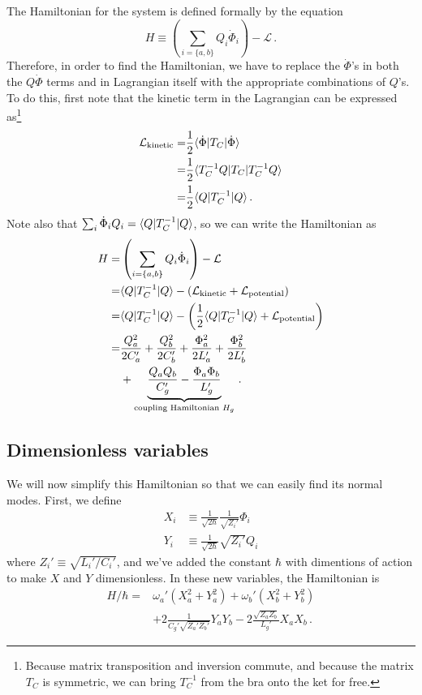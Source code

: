 \documentclass{article}
\begin{document}
The Hamiltonian for the system is defined formally by the equation
\begin{equation*}
  H \equiv \left( \sum_{i = \{a, b\}} Q_i \dot \Phi_i \right) - \mathcal{L} \, .
\end{equation*}
Therefore, in order to find the Hamiltonian, we have to replace the $\dot \Phi$'s in both the $Q \dot \Phi$ terms and in Lagrangian itself with the appropriate combinations of $Q$'s.
To do this, first note that the kinetic term in the Lagrangian can be expressed as\footnote{Because matrix transposition and inversion commute, and because the matrix $T_C$ is symmetric, we can bring $T_C^{-1}$ from the bra onto the ket for free.}
\begin{align*}
  \mathcal{L}_\text{kinetic}
  =& \frac{1}{2} \langle \dot \Phi | T_C | \dot \Phi \rangle \\
  =& \frac{1}{2} \langle T_C^{-1} Q | T_C | T_C^{-1} Q \rangle \\
  =& \frac{1}{2} \langle Q | T_C^{-1} | Q \rangle
  \, .
\end{align*}
Note also that $\sum_i \dot \Phi_i Q_i = \langle Q | T_C^{-1} | Q \rangle$, so we can write the Hamiltonian as
\begin{align}
  H
  =& \left( \sum_{i = \{a, b\}} Q_i \dot \Phi_i \right) - \mathcal{L} \nonumber \\
  =& \langle Q | T_C^{-1} | Q \rangle - \left( \mathcal{L}_\text{kinetic} + \mathcal{L}_\text{potential} \right) \nonumber \\
  =& \langle Q | T_C^{-1} | Q \rangle - \left( \frac{1}{2} \langle Q | T_C^{-1} | Q \rangle + \mathcal{L}_\text{potential} \right) \nonumber \\
  =& \frac{Q_a^2}{2 C_a'} + \frac{Q_b^2}{2 C_b'} + \frac{\Phi_a^2}{2 L_a'} + \frac{\Phi_b^2}{2 L_b'} \nonumber \\
  &+ \underbrace{\frac{Q_a Q_b}{C_g'} - \frac{\Phi_a \Phi_b}{L_g'}}_{\text{coupling Hamiltonian }H_g}
  \, .
\end{align}

\subsection{Dimensionless variables}

We will now simplify this Hamiltonian so that we can easily find its normal modes.
First, we define
\begin{align*}
  X_i &\equiv \frac{1}{\sqrt{2 \hbar}} \frac{1}{\sqrt{Z_i'}} \Phi_i \\
  Y_i &\equiv \frac{1}{\sqrt{2 \hbar}} \sqrt{Z_i'} Q_i
\end{align*}
where $Z_i' \equiv \sqrt{L_i' / C_i'}$, and we've added the constant $\hbar$ with dimentions of action to make $X$ and $Y$ dimensionless.
In these new variables, the Hamiltonian is
\begin{align}
  H / \hbar
  =& \omega_a' \left(X_a^2 + Y_a^2 \right)
  +  \omega_b' \left(X_b^2 + Y_b^2 \right) \nonumber \\
  &+ 2 \frac{1}{C_g' \sqrt{Z_a' Z_b'}} Y_a Y_b
   - 2 \frac{\sqrt{Z_a Z_b}}{L_g'} X_a X_b
  \, .
\end{align}
\end{document}
